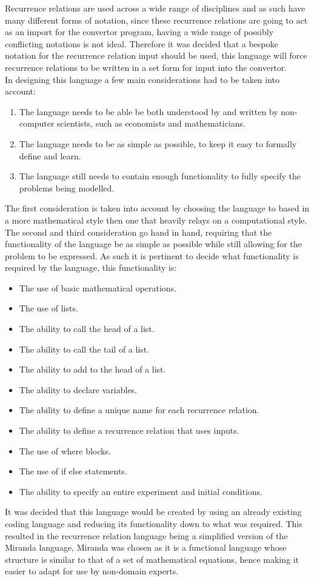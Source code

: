 \documentclass{article}
\begin{document}
Recurrence relations are used across a wide range of disciplines and as such have many different forms of notation, since these recurrence relations are going to act as an import for the convertor program, having a wide range of possibly conflicting notations is not ideal. Therefore it was decided that a bespoke notation for the recurrence relation input should be used, this language will force recurrence relations to be written in a set form for input into the convertor.\\
In designing this language a few main considerations had to be taken into account:    
\begin{enumerate}
  \item The language needs to be able be both understood by and written by non-computer scientists, such as economists and mathematicians. 
  \item The language needs to be as simple as possible, to keep it easy to formally define and learn.
  \item The language still needs to contain enough functionality to fully specify the problems being modelled.
\end{enumerate}
The first consideration is taken into account by choosing the language to based in a more mathematical style then one that heavily relays on a computational style.%
The second and third consideration go hand in hand, requiring that the functionality of the language be as simple as possible while still allowing for the problem to be expressed. As such it is pertinent to decide what functionality is required by the language, this functionality is:      
\begin{itemize}
  \item The use of basic mathematical operations.
  \item The use of lists.
  \item The ability to call the head of a list. %
  \item The ability to call the tail of a list. %
  \item The ability to add to the head of a list. %
  \item The ability to declare variables.  
  \item The ability to define a unique name for each recurrence relation.
  \item The ability to define a recurrence relation that uses inputs.
  \item The use of where blocks.
  \item The use of if else statements. 
  \item The ability to specify an entire experiment and initial conditions.  
\end{itemize}
It was decided that this language would be created by using an already existing coding language and reducing its functionality down to what was required. This resulted in the recurrence relation language being a simplified version of the Miranda language, Miranda was chosen as it is a functional language whose structure is similar to that of a set of mathematical equations, hence making it easier to adapt for use by non-domain experts.   
\end{document}
